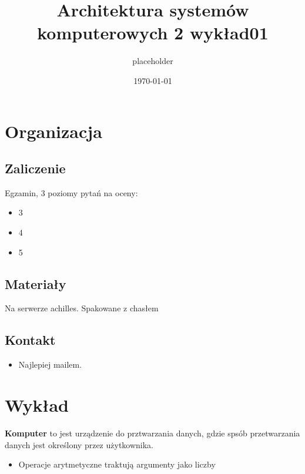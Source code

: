 \documentclass[11pt]{article}
\author{placeholder}
\date{\today}
\title{Architektura systemów komputerowych 2 wykład01}
\begin{document}
\maketitle
\tableofcontents

\section{Organizacja}
\label{sec:orga12fa13}
\subsection{Zaliczenie}
\label{sec:org21c1496}
Egzamin, 3 poziomy pytań na oceny:
\begin{itemize}
\item 3
\item 4
\item 5
\end{itemize}
\subsection{Materiały}
\label{sec:orgb299c0f}
Na serwerze achilles. Spakowane z chasłem
\subsection{Kontakt}
\label{sec:org41ed875}
\begin{itemize}
\item Najlepiej mailem.
\end{itemize}
\section{Wykład}
\label{sec:org61f9951}
\textbf{Komputer} to jest urządzenie do prztwarzania danych, gdzie spsób przetwarzania danych jest określony przez użytkownika.
\begin{itemize}
\item Operacje arytmetyczne traktują argumenty jako liczby
\end{itemize}
\end{document}
